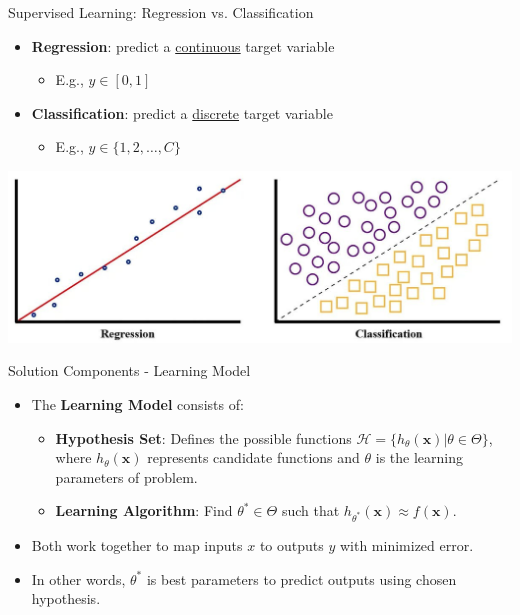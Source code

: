 \documentclass[serif, aspectratio=169]{beamer}
\begin{document}
\begin{frame}{Supervised Learning: Regression vs. Classification}

    \begin{itemize}
        \item \textbf{Regression}: predict a \underline{continuous} target variable
        \begin{itemize}
            \item E.g., $y \in [0, 1]$
        \end{itemize}
        \item \textbf{Classification}: predict a \underline{discrete} target variable
        \begin{itemize}
            \item E.g., $y \in \{1, 2, \ldots, C\}$
        \end{itemize}
    \end{itemize}
    
        \centering
        \includegraphics[width=0.8\linewidth]{pic/regressionVSclassification.jpg}
    
   

\end{frame}



\begin{frame}{Solution Components - Learning Model}
    \begin{itemize}
        \item The \textbf{Learning Model} consists of:
        \begin{itemize}
            \item \textbf{Hypothesis Set}: Defines the possible functions \( \mathcal{H} = \{h_{\theta}(\mathbf{x}) | \theta \in \Theta\} \), where \( h_\theta(\mathbf{x}) \) represents candidate functions and \( \theta \) is the learning parameters of problem.
            \item \textbf{Learning Algorithm}: Find \( \theta^* \in \Theta \) such that \( h_{\theta^*}(\mathbf{x}) \approx f(\mathbf{x}) \).
        \end{itemize}
        \item Both work together to map inputs \(x\) to outputs \(y\) with minimized error.
        \item In other words, \( \theta^* \) is best parameters to predict outputs using chosen hypothesis.
    \end{itemize}
    \vspace{0.5cm}
\end{frame}
\end{document}
